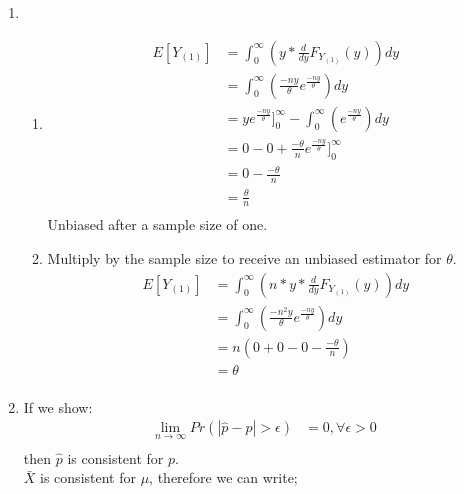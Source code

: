 \documentclass{article}
\begin{document}

\begin{enumerate}

\item 
	\begin{enumerate}
	\item
		\begin{equation*}
		\begin{split}
		E[Y_{(1)}] & = \int_{0}^{\infty} (y*\frac{d}{dy}F_{Y_{(1)}}(y))dy \\
		& = \int_{0}^{\infty} (\frac{-ny}{\theta} e^{\frac{-ny}{\theta}})dy \\
		& = ye^{\frac{-ny}{\theta}}]_{0}^{\infty} - \int_{0}^{\infty} (e^{\frac{-ny}{\theta}})dy \\
		& = 0-0 +\frac{-\theta}{n} e^{\frac{-ny}{\theta}}]_{0}^{\infty}\\
		& = 0-\frac{-\theta}{n}\\
		& = \frac{\theta}{n}\\
		\end{split}
		\end{equation*}
		Unbiased after a sample size of one.
	\item
		Multiply by the sample size to receive an unbiased estimator for $\theta$.
		\begin{equation*}
		\begin{split}
		E[Y_{(1)}] & = \int_{0}^{\infty} (n*y*\frac{d}{dy}F_{Y_{(1)}}(y))dy \\
		& = \int_{0}^{\infty} (\frac{-n^{2}y}{\theta} e^{\frac{-ny}{\theta}})dy \\
		& =n( 0+0 - 0 -\frac{-\theta}{n})\\
		& = \theta \\
		\end{split}
		\end{equation*}
	\end{enumerate}
\item
	If we show:
	\begin{equation*}
	\begin{split}
	\lim_{n\rightarrow \infty} Pr(\left| \hat{p} - p \right| > \epsilon) &= 0, \forall \epsilon > 0 \\
	\end{split}
	\end{equation*}
	then $\hat{p}$ is consistent for $p$.	\\
	$\bar{X}$ is consistent for $\mu$, therefore we can write;
	\begin{equation*}

\end{equation*}
\end{enumerate}
\end{document}
